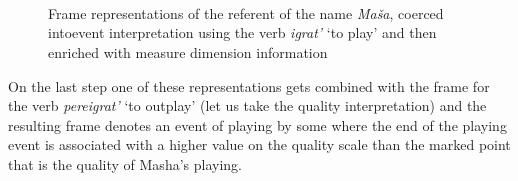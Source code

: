 \begin{figure}
\begin{minipage}{0.45\textwidth}
\\

\\
\end{minipage}
\hfill
\begin{minipage}{0.45\textwidth}
\\
\end{minipage}
\caption{Frame representations of the referent of the name \textit{Ma\v{s}a}, coerced intoevent interpretation using the verb \textit{igrat'} `to play' and then enriched with measure dimension information \label{frame:Masha:play}}
\end{figure}

On the last step one of these representations gets combined with the frame for the verb \textit{pereigrat'} `to outplay' (let us take the quality interpretation) and the resulting frame denotes an event of playing by some \ACTOR  where the end of the playing event is associated with a higher value on the quality scale than the marked point that is the quality of Masha's playing.

